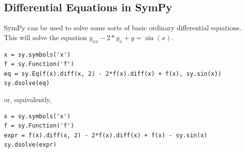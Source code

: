 \subsection*{Differential Equations in SymPy}%

SymPy can be used to solve some sorts of basic ordinary differential equations.
This will solve the equation $y_{xx}-2*y_x+y=\sin\left(x\right)$.
\begin{lstlisting}
x = sy.symbols('x')
f = sy.Function('f')
eq = sy.Eq(f(x).diff(x, 2) - 2*f(x).diff(x) + f(x), sy.sin(x))
sy.dsolve(eq)
\end{lstlisting}
or, equivalently,
\begin{lstlisting}
x = sy.symbols('x')
f = sy.Function('f')
expr = f(x).diff(x, 2) - 2*f(x).diff(x) + f(x) - sy.sin(x)
sy.dsolve(expr)
\end{lstlisting}

